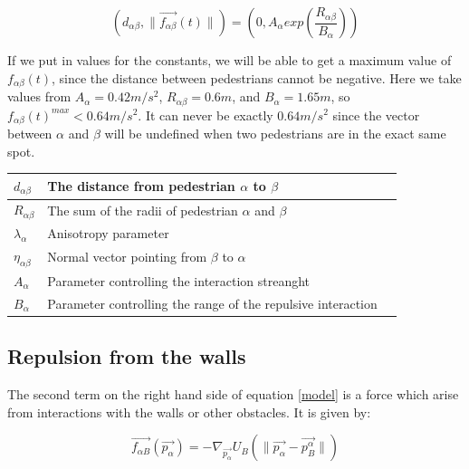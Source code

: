 \begin{equation}
	\left( d_{\alpha \beta} , \| \overrightarrow{f_{\alpha \beta}} \left( t \right) \| \right)
 =
	\left( 0 , A_{\alpha} exp\left( \frac{R_{\alpha\beta} }{B_{\alpha}}\right)  \right) 
\end{equation}

If we put in values for the constants, we will be able to get a maximum value of $ f_{\alpha\beta}(t) $, 
since the distance between pedestrians cannot be negative. Here we take values from \cite{ABconstant} $ A_{\alpha} = 0.42 m/s^{2} $, 
$ R_{\alpha\beta} = 0.6 m $, and $ B_{\alpha} = 1.65 m $, so 
$ f_{\alpha\beta}(t)^{max} < 0.64 m/s^{2} $. It can never be exactly $0.64m/s^2$ since the vector between $\alpha$ and $\beta$ will be undefined when two pedestrians are in the exact same spot.


\begin{center}
\begin{tabular}{lll}
\hline
$d_{\alpha \beta}$& The distance from pedestrian $\alpha$ to $\beta$ &\\
\hline
$R_{\alpha\beta}$& The sum of the radii of pedestrian $\alpha$ and $\beta$ \\
\hline
$\lambda_{\alpha}$& Anisotropy parameter &\\
\hline
$\eta_{\alpha \beta}$& Normal vector pointing from $\beta$ to $\alpha$ \\
\hline
$A_{\alpha}$& Parameter controlling the interaction streanght \\
\hline
$B_{\alpha}$& Parameter controlling the range of the repulsive interaction  \\
\hline
\end{tabular}
\end{center}

\subsection{Repulsion from the walls}\label{seq:repulsion-walls}
The second term on the right hand side of equation \eqref{model} is a force which 
arise from interactions with the walls or other obstacles. It is given by:

\begin{equation}\label{wallpotential}
    \overrightarrow{f_{\alpha B}} \left( \overrightarrow{p_{\alpha}} \right) =
    - \nabla_{\overrightarrow{p_{\alpha}}} U_{B}
    \left( \| \overrightarrow{p_{\alpha}} - \overrightarrow{p_{B}^{\alpha}} \| \right)
\end{equation}

